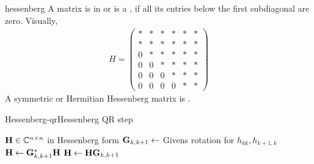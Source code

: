 \begin{Definition}{hessenberg}
  A matrix is in  or is a , if all its entries below the first subdiagonal are zero. Visually,
  \begin{gather}
    H = 
    \begin{pmatrix}
      *&*&*&*&*&*\\
      *&*&*&*&*&*\\
      0&*&*&*&*&*\\
      0&0&*&*&*&*\\
      0&0&0&*&*&*\\
      0&0&0&0&*&*
    \end{pmatrix}
  \end{gather}
  A symmetric or Hermitian Hessenberg matrix is .
\end{Definition}

\begin{Algorithm*}{Hessenberg-qr}{Hessenberg QR step}
  \begin{algorithmic}[1]
    \Require $\mathbf H\in\mathbb C^{n\times n}$ in Hessenberg form
    \State $\mathbf G_{k,k+1} \gets$ Givens rotation for $h_{kk},h_{k+1,k}$
    \State $\mathbf H\gets \mathbf G^*_{k,k+1}\mathbf H$
    \EndFor
    \Comment{$\matH = \matr\matq$}
    \State $\mathbf H\gets \mathbf H\mathbf G_{k,k+1}$    
    \EndFor
  \end{algorithmic}  
\end{Algorithm*}

